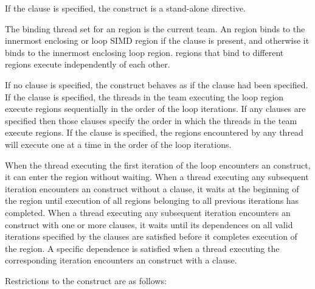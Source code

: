 If the  clause is specified, the  construct is a stand-alone directive.

\binding
The binding thread set for an  region is the current team. An  region
binds to the innermost enclosing  or loop SIMD region if the
 clause is present, and otherwise it binds to the innermost
enclosing loop region.  regions that bind to different regions
execute independently of each other.

\descr
If no clause is specified, the  construct behaves as if the
 clause had been specified. If the  clause is
specified, the threads in the team executing the loop region execute
 regions sequentially in the order of the loop iterations.
If any  clauses are specified then those clauses specify the
order in which the threads in the team execute  regions. If
the  clause is specified, the  regions encountered by
any thread will execute one at a time in the order of the loop iterations.

When the thread executing the first iteration of the loop encounters an
 construct, it can enter the  region without
waiting. When a thread executing any subsequent iteration encounters an
 construct without a  clause, it waits at the
beginning of the  region until execution of all 
regions belonging to all previous iterations has completed. When a thread
executing any subsequent iteration encounters an  construct with
one or more {} clauses, it waits until its dependences on
all valid iterations specified by the  clauses
are satisfied before it completes execution of the  region.
A specific dependence is satisfied when a thread executing the corresponding
iteration encounters an  construct with a  clause.



\restrictions
Restrictions to the  construct are as follows:

